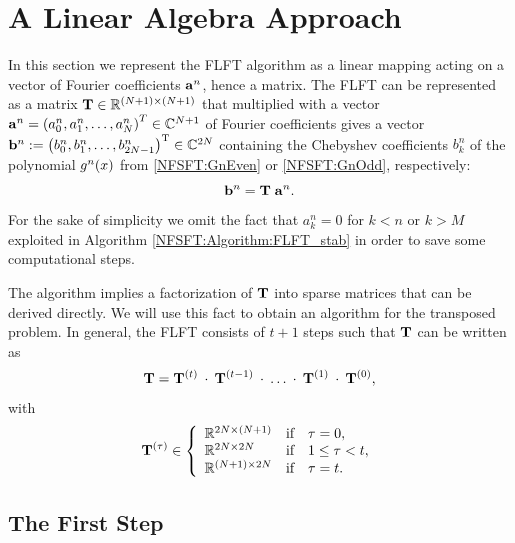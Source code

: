 \section{A Linear Algebra Approach}
\label{DSFT:LinearAlgebra}

In this section we represent the FLFT algorithm as a linear mapping acting on a vector of Fourier coefficients $\mathbf{a}^n$, hence a matrix. 
The FLFT can be represented as a matrix $\mathbf{T} \in \mathbb{R}^{(N+1) \times (N+1)}$ that multiplied with a vector $\mathbf{a}^n = \left(a_0^n,a_1^n,\dots,a_N^n\right)^T \in \mathbb{C}^{N+1}$ of Fourier coefficients gives a vector $\mathbf{b}^n := \left(b_0^n,b_1^n,\dots,b_{2N-1}^n\right)^{\text{\rm{T}}} \in \mathbb{C}^{2N}$ containing the Chebyshev coefficients $b_{k}^n$ of the polynomial $g^n{\hspace{-0.4ex}}\left(x\right)$ from \eqref{NFSFT:GnEven} or \eqref{NFSFT:GnOdd}, respectively: 
\[\mathbf{b}^{n} = \mathbf{T} \; \mathbf{a}^n.\] 
For the sake of simplicity we omit the fact that $a_{k}^n = 0$ for $k < n$ or $k > M$ exploited in Algorithm \ref{NFSFT:Algorithm:FLFT_stab} in order to save some computational steps.

The algorithm implies a factorization of $\mathbf{T}$ into sparse matrices that can be derived directly.
We will use this fact to obtain an algorithm for the transposed problem. In general, the FLFT consists of $t+1$ steps such that $\mathbf{T}$ can be written as 
\[
  \mathbf{T} = \mathbf{T}^{(t)} \: \cdot \:  \mathbf{T}^{(t-1)} \: \cdot \: \dots \: \cdot \: \mathbf{T}^{(1)} \: \cdot \:  \mathbf{T}^{(0)},
\]
with
\[
 \V{T}^{(\tau)} \in \left\{\begin{array}{l@{\quad \text{if} \quad}l} \R^{2N \times (N+1)} & \tau = 0, \\ \R^{2N \times 2N} & 1 \le \tau < t, \\ \R^{(N+1) \times 2N} & \tau = t. \end{array}\right.
\]

\subsection{The First Step}

